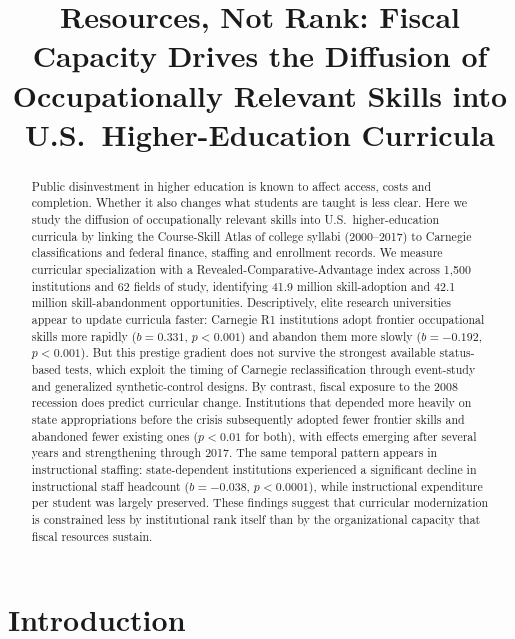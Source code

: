 \documentclass[11pt, letterpaper]{article}
\title{\textbf{Resources, Not Rank: Fiscal Capacity Drives the Diffusion of Occupationally Relevant Skills into U.S.\ Higher-Education Curricula}}
\author{}
\date{}
\begin{document}
\maketitle

\begin{abstract}
Public disinvestment in higher education is known to affect access, costs and completion. Whether it also changes what students are taught is less clear. Here we study the diffusion of occupationally relevant skills into U.S.\ higher-education curricula by linking the Course-Skill Atlas of college syllabi (2000--2017) to Carnegie classifications and federal finance, staffing and enrollment records. We measure curricular specialization with a Revealed-Comparative-Advantage index across 1,500 institutions and 62 fields of study, identifying 41.9 million skill-adoption and 42.1 million skill-abandonment opportunities. Descriptively, elite research universities appear to update curricula faster: Carnegie R1 institutions adopt frontier occupational skills more rapidly ($b=0.331$, $p<0.001$) and abandon them more slowly ($b=-0.192$, $p<0.001$). But this prestige gradient does not survive the strongest available status-based tests, which exploit the timing of Carnegie reclassification through event-study and generalized synthetic-control designs. By contrast, fiscal exposure to the 2008 recession does predict curricular change. Institutions that depended more heavily on state appropriations before the crisis subsequently adopted fewer frontier skills and abandoned fewer existing ones ($p<0.01$ for both), with effects emerging after several years and strengthening through 2017. The same temporal pattern appears in instructional staffing: state-dependent institutions experienced a significant decline in instructional staff headcount ($b=-0.038$, $p<0.0001$), while instructional expenditure per student was largely preserved. These findings suggest that curricular modernization is constrained less by institutional rank itself than by the organizational capacity that fiscal resources sustain.
\end{abstract}

\clearpage
\section*{Introduction}
\end{document}
